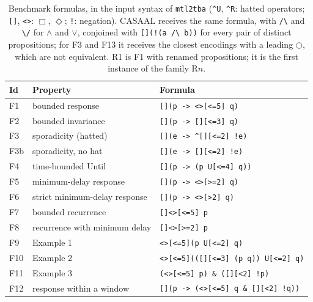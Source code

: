 \begin{table}[t]
\centering
\caption{Benchmark formulas, in the input syntax of \texttt{mtl2tba} (\texttt{\^{}U}, \texttt{\^{}R}: hatted operators; \texttt{[]}, \texttt{<>}: $\Box$, $\Diamond$; \texttt{!}: negation).  CASAAL receives the same formula, with \texttt{/\textbackslash} and \texttt{\textbackslash/} for $\wedge$ and $\vee$, conjoined with \texttt{[](!(a /\textbackslash{} b))} for every pair of distinct propositions; for F3 and F13 it receives the closest encodings with a leading $\bigcirc$, which are not equivalent.  R1 is F1 with renamed propositions; it is the first instance of the family R$n$.}
\label{tab:formulas}
\small
\begin{tabular}{@{}llp{}@{}}
\toprule
Id & Property & Formula\\
\midrule
F1 & bounded response & \texttt{[](p -\textgreater{} \textless{}\textgreater{}[\textless{}=5] q)}\\
F2 & bounded invariance & \texttt{[](p -\textgreater{} [][\textless{}=3] q)}\\
F3 & sporadicity (hatted) & \texttt{[](e -\textgreater{} \^{}[][\textless{}=2] !e)}\\
F3b & sporadicity, no hat & \texttt{[](e -\textgreater{} [][\textless{}=2] !e)}\\
F4 & time-bounded Until & \texttt{[](p -\textgreater{} (p U[\textless{}=4] q))}\\
F5 & minimum-delay response & \texttt{[](p -\textgreater{} \textless{}\textgreater{}[\textgreater{}=2] q)}\\
F6 & strict minimum-delay response & \texttt{[](p -\textgreater{} \textless{}\textgreater{}[\textgreater{}2] q)}\\
F7 & bounded recurrence & \texttt{[]\textless{}\textgreater{}[\textless{}=5] p}\\
F8 & recurrence with minimum delay & \texttt{[]\textless{}\textgreater{}[\textgreater{}=2] p}\\
F9 & Example 1 & \texttt{\textless{}\textgreater{}[\textless{}=5](p U[\textless{}=2] q)}\\
F10 & Example 2 & \texttt{\textless{}\textgreater{}[\textless{}=5](([][\textless{}=3] (p \textbar{} q)) U[\textless{}=2] q)}\\
F11 & Example 3 & \texttt{(\textless{}\textgreater{}[\textless{}=5] p) \& ([][\textless{}2] !p)}\\
F12 & response within a window & \texttt{[](p -\textgreater{} (\textless{}\textgreater{}[\textless{}=5] q \& [][\textless{}2] !q))}\\

\end{tabular}
\end{table}
